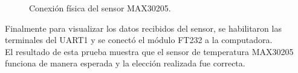 \begin{figure}[htbp!]
	\centering
	\caption{Conexión física del sensor MAX30205.}
	\label{fig:ConexionFisicaMAX30205}
\end{figure}


Finalmente para visualizar los datos recibidos del sensor, se habilitaron las terminales del UART1 y se conectó el módulo FT232 a la computadora. \\

%
%

El resultado de esta prueba muestra que el sensor de temperatura MAX30205 funciona de manera esperada y la elección realizada fue correcta.

\clearpage